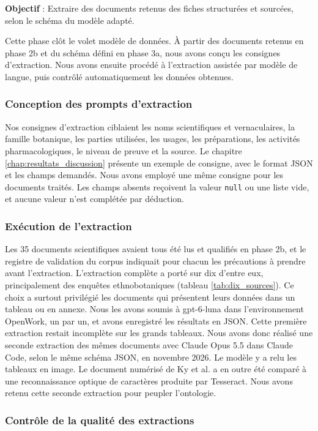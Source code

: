 \textbf{Objectif} : Extraire des documents retenus des fiches structurées et sourcées, selon le schéma du modèle adapté.

Cette phase clôt le volet modèle de données. À partir des documents retenus en phase 2b et du schéma défini en phase 3a, nous avons conçu les consignes d'extraction. Nous avons ensuite procédé à l'extraction assistée par modèle de langue, puis contrôlé automatiquement les données obtenues.

\subsubsection{Conception des prompts d'extraction}

Nos consignes d'extraction ciblaient les noms scientifiques et vernaculaires, la famille botanique, les parties utilisées, les usages, les préparations, les activités pharmacologiques, le niveau de preuve et la source. Le chapitre \ref{chap:resultats_discussion} présente un exemple de consigne, avec le format JSON et les champs demandés. Nous avons employé une même consigne pour les documents traités. Les champs absents reçoivent la valeur \texttt{null} ou une liste vide, et aucune valeur n'est complétée par déduction.

\subsubsection{Exécution de l'extraction}

Les 35 documents scientifiques avaient tous été lus et qualifiés en phase 2b, et le registre de validation du corpus indiquait pour chacun les précautions à prendre avant l'extraction. L'extraction complète a porté sur dix d'entre eux, principalement des enquêtes ethnobotaniques (tableau \ref{tab:dix_sources}). Ce choix a surtout privilégié les documents qui présentent leurs données dans un tableau ou en annexe. Nous les avons soumis à gpt-6-luna dans l'environnement OpenWork, un par un, et avons enregistré les résultats en JSON. Cette première extraction restait incomplète sur les grands tableaux. Nous avons donc réalisé une seconde extraction des mêmes documents avec Claude Opus 5.5 dans Claude Code, selon le même schéma JSON, en novembre 2026. Le modèle y a relu les tableaux en image. Le document numérisé de Ky et al. a en outre été comparé à une reconnaissance optique de caractères produite par Tesseract. Nous avons retenu cette seconde extraction pour peupler l'ontologie.

\subsubsection{Contrôle de la qualité des extractions}

